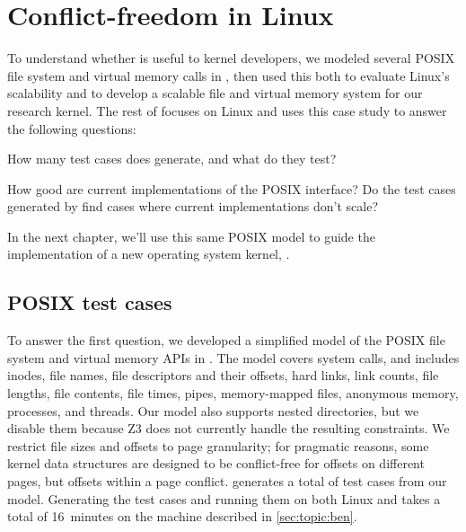 \section{Conflict-freedom in Linux}
\label{sec:linux}
\label{sec:topic:model}


To understand whether \tool{} is useful to kernel developers,
we modeled several POSIX file system and virtual memory calls in \tool,
then used this both to evaluate Linux's scalability and to develop a
scalable file and virtual memory system for our \sys research kernel.
%
The rest of  focuses on Linux and uses this case study to
answer the following questions:

\begin{CompactItemize}

\item How many test cases does \tool{} generate, and what do they test?

\item How good are current implementations of the POSIX interface?
      Do the test cases generated by \tool{} find
      cases where current implementations don't scale?

\end{CompactItemize}

In the next chapter, we'll use this same POSIX model to guide the
implementation of a new operating system kernel, \sys.

\subsection{POSIX test cases}

To answer the first question, we developed a simplified model of the
POSIX file system and virtual memory APIs in \tool{}.  The model covers
 system
calls, and includes inodes, file
names, file descriptors and their offsets, hard links, link counts,
file lengths, file contents, file times, pipes, memory-mapped files,
anonymous memory, processes, and threads.  Our model
also supports nested
directories, but we disable them because Z3 does not currently handle
the resulting constraints.
%
We restrict file sizes and offsets to page granularity; for pragmatic
reasons, some kernel data structures are designed to be conflict-free
for offsets on different pages, but
offsets within a page conflict.
%
\tool generates a total of  test cases
from our model.
%
Generating the test cases and running them on both Linux and \sys
takes a total of 16~minutes on the machine described in
\cref{sec:topic:ben}.

